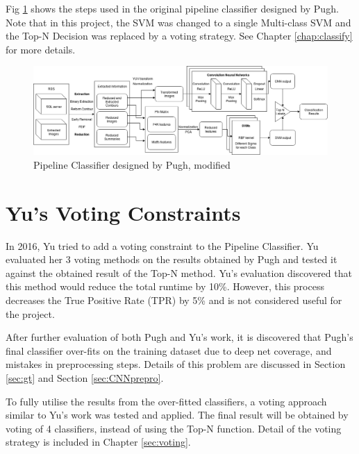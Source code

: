 \documentclass[bsc,frontabs,twoside,fullspacing,parskip,deptreport]{infthesis}
\begin{document}
Fig \ref{fig:pipeline} shows the steps used in the original pipeline classifier designed by Pugh.
Note that in this project, the SVM was changed to a single Multi-class SVM and the Top-N Decision was replaced by a voting strategy.
See Chapter \ref{chap:classify} for more details.

\begin{figure}[!h]
    \centering
    \includegraphics[scale=0.35]{graph/Pipeline_Classifier.png}
    \caption{Pipeline Classifier designed by Pugh, modified}
    \label{fig:pipeline}
\end{figure}

\section{Yu's Voting Constraints}

In 2016, Yu\cite{Yu} tried to add a voting constraint to the Pipeline Classifier. 
Yu evaluated her 3 voting methods on the results obtained by Pugh and tested it against the obtained result of the Top-N method. 
Yu's evaluation discovered that this method would reduce the total runtime by 10\%. 
However, this process decreases the True Positive Rate (TPR) by 5\% and is not considered useful for the project. 

After further evaluation of both Pugh and Yu's work, it is discovered that Pugh's final classifier over-fits on the training dataset due to deep net coverage, and mistakes in preprocessing steps. Details of this problem are discussed in Section \ref{sec:gt} and Section \ref{sec:CNNprepro}. 

To fully utilise the results from the over-fitted classifiers, a voting approach similar to Yu's work was tested and applied. 
The final result will be obtained by voting of 4 classifiers, instead of using the Top-N function.
Detail of the voting strategy is included in Chapter \ref{sec:voting}.

\end{document}
